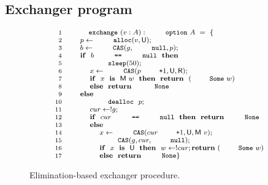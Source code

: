 \subsection{Exchanger program} 
\label{sec:exchanger}

\newcommand{\Unmatched}{{\mathsf{U}}}
\newcommand{\Matched}[1]{{\mathsf{M}\ #1}}
\newcommand{\Retired}{{\mathsf{R}}}

{
\setlength{\belowcaptionskip}{-10pt} 
\begin{figure}
\centering
\[
{\small{
\begin{array}{rl}
 \Num{1} & \esc{exchange}~(v : A) : \esc{option}~A~=~\{ 
\\ 
 \Num{2} & ~~~~ p \Asgn \esc{alloc}(v, \Unmatched);\\
 \Num{3} & ~~~~ b \Asgn \esc{CAS}(g, \esc{null}, p);\\
 \Num{4} & ~~~~ \kw{if}~~b~\esc{==}~\esc{null}~~\kw{then}\\
 \Num{5} & ~~~~ ~~~~ \esc{sleep}(50);\\
 \Num{6} & ~~~~ ~~~~ x \Asgn \esc{CAS}(p\esc{+}1, \Unmatched, \Retired);\\
 \Num{7} & ~~~~ ~~~~ \kw{if}~~x~~\kw{is}~~\Matched w~~\kw{then}~~\kw{return}~~(\esc{Some}~w)\\
 \Num{8} & ~~~~ ~~~~ \kw{else}~~\kw{return}~~\esc{None}\\
 \Num{9} & ~~~~ \kw{else}\\
\Num{10} & ~~~~ ~~~~ \esc{dealloc}~~p;\\
\Num{11} & ~~~~ ~~~~ cur \Asgn !g;\\
\Num{12} & ~~~~ ~~~~ \kw{if}~~cur~\esc{==}~\esc{null}~~\kw{then}~~\kw{return}~{\esc{None}}\\
\Num{13} & ~~~~ ~~~~ \kw{else}\\
\Num{14} & ~~~~ ~~~~ ~~~~ x \Asgn \esc{CAS}(cur\esc{+}1, \Unmatched, \Matched v);\\
\Num{15} & ~~~~ ~~~~ ~~~~ \esc{CAS}(g, cur, \esc{null});\\
\Num{16} & ~~~~ ~~~~ ~~~~ \kw{if}~~x~~\kw{is}~~\Unmatched~~\kw{then}~~w\Asgn !cur;\kw{return}~(\esc{Some}\ w)\\
\Num{17} & ~~~~ ~~~~ ~~~~ \kw{else}~~\kw{return}~\esc{None}\}
\end{array}
}}
\]
\caption{Elimination-based exchanger procedure.}
\label{fig:exchanger}
\end{figure} 
}

